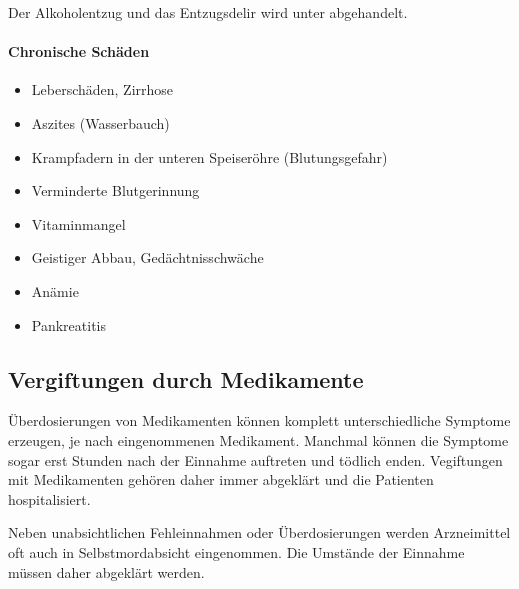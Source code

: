 Der Alkoholentzug und das Entzugsdelir wird unter
 abgehandelt.

\paragraph{Chronische Schäden}

\begin{itemize}
    \item Leberschäden, Zirrhose
    \item Aszites (Wasserbauch)
    \item Krampfadern in der unteren Speiseröhre  (Blutungsgefahr)
    \item Verminderte Blutgerinnung
    \item Vitaminmangel
    \item Geistiger Abbau, Gedächtnisschwäche
    \item Anämie
    \item Pankreatitis
\end{itemize}










\subsection{Vergiftungen durch Medikamente}

Überdosierungen von Medikamenten können komplett
unterschiedliche Symptome erzeugen, je nach eingenommenen
Medikament. Manchmal können die Symptome sogar erst Stunden
nach der Einnahme auftreten und tödlich enden. Vegiftungen
mit Medikamenten gehören daher immer abgeklärt und die
Patienten hospitalisiert. 

Neben unabsichtlichen Fehleinnahmen oder Überdosierungen
werden Arzneimittel oft auch in Selbstmordabsicht
eingenommen. Die Umstände der Einnahme müssen daher
abgeklärt werden.


